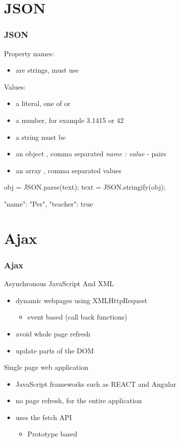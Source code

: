 \section{JSON}
\begin{frame}[fragile]\frametitle{JSON}
Property names:
\begin{itemize}
  \item  are strings, must use 
\end{itemize}
Values:
\begin{itemize}
  \item  a literal, one of  or 
  \item  a number, for example 3.1415 or 42
  \item  a string must be 
  \item  an object \code{\{\}}, comma separated \emph{name : value} - pairs
  \item  an array \code{[]}, comma separated values
\end{itemize}
\begin{CodeBox}{}
obj = JSON.parse(text);
text = JSON.stringify(obj);
\end{CodeBox}
\begin{CodeBox}{}
{"name": "Per", "teacher": true }
\end{CodeBox}
\end{frame}


\section{Ajax}
\begin{frame}[fragile]\frametitle{Ajax}
Asynchronous JavaScript And XML
\begin{itemize}
  \item dynamic webpages using XMLHttpRequest
  \begin{itemize}
    \item event based (call back functions)
  \end{itemize}
  \item avoid whole page refresh
  \item update parts of the DOM
\end{itemize}
Single page web application
\begin{itemize}
  \item JavaScript frameworks such as REACT and Angular
  \item no page refresh, for the entire application
  \item uses the fetch API
  \begin{itemize}
    \item Prototype based
  \end{itemize}
\end{itemize}
\end{frame}

